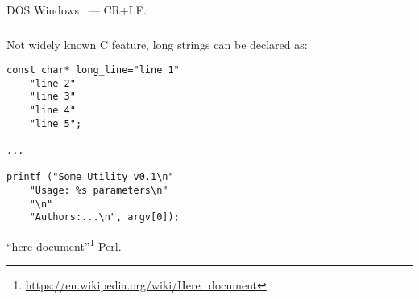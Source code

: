  DOS  Windows ~--- CR+LF.

\subsubsection{}
\label{heredoc}
{Not widely known C feature, long strings can be declared as}:

\begin{lstlisting}
const char* long_line="line 1"
	"line 2"
	"line 3"
	"line 4"
	"line 5";

...

printf ("Some Utility v0.1\n"
	"Usage: %s parameters\n"
	"\n"
	"Authors:...\n", argv[0]);
\end{lstlisting}

``here document''\footnote{\url{https://en.wikipedia.org/wiki/Here_document}} 
 \AndENRU Perl.

